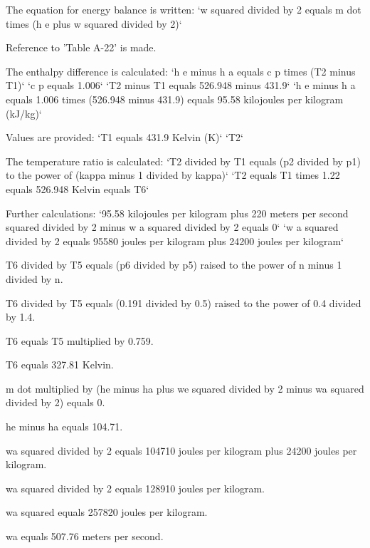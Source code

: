The equation for energy balance is written:  
`w squared divided by 2 equals m dot times (h e plus w squared divided by 2)`  

Reference to 'Table A-22' is made.  

The enthalpy difference is calculated:  
`h e minus h a equals c p times (T2 minus T1)`  
`c p equals 1.006`  
`T2 minus T1 equals 526.948 minus 431.9`  
`h e minus h a equals 1.006 times (526.948 minus 431.9) equals 95.58 kilojoules per kilogram (kJ/kg)`  

Values are provided:  
`T1 equals 431.9 Kelvin (K)`  
`T2`  

The temperature ratio is calculated:  
`T2 divided by T1 equals (p2 divided by p1) to the power of (kappa minus 1 divided by kappa)`  
`T2 equals T1 times 1.22 equals 526.948 Kelvin equals T6`  

Further calculations:  
`95.58 kilojoules per kilogram plus 220 meters per second squared divided by 2 minus w a squared divided by 2 equals 0`  
`w a squared divided by 2 equals 95580 joules per kilogram plus 24200 joules per kilogram`

T6 divided by T5 equals (p6 divided by p5) raised to the power of n minus 1 divided by n.  

T6 divided by T5 equals (0.191 divided by 0.5) raised to the power of 0.4 divided by 1.4.  

T6 equals T5 multiplied by 0.759.  

T6 equals 327.81 Kelvin.  

m dot multiplied by (he minus ha plus we squared divided by 2 minus wa squared divided by 2) equals 0.  

he minus ha equals 104.71.  

wa squared divided by 2 equals 104710 joules per kilogram plus 24200 joules per kilogram.  

wa squared divided by 2 equals 128910 joules per kilogram.  

wa squared equals 257820 joules per kilogram.  

wa equals 507.76 meters per second.